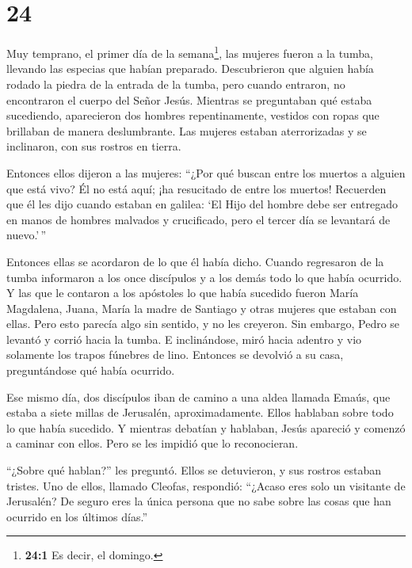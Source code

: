 \hypertarget{section-23}{%
\section{24}\label{section-23}}

 Muy temprano, el primer día de la semana\footnote{\textbf{24:1}
  Es decir, el domingo.}, las mujeres fueron a la tumba, llevando las
especias que habían preparado.  Descubrieron que alguien
había rodado la piedra de la entrada de la tumba,  pero
cuando entraron, no encontraron el cuerpo del Señor Jesús. 
Mientras se preguntaban qué estaba sucediendo, aparecieron dos hombres
repentinamente, vestidos con ropas que brillaban de manera deslumbrante.
 Las mujeres estaban aterrorizadas y se inclinaron, con sus
rostros en tierra.

Entonces ellos dijeron a las mujeres: ``¿Por qué buscan entre los
muertos a alguien que está vivo?  Él no está aquí; ¡ha
resucitado de entre los muertos! Recuerden que él les dijo cuando
estaban en galilea:  `El Hijo del hombre debe ser entregado
en manos de hombres malvados y crucificado, pero el tercer día se
levantará de nuevo.'\,''

 Entonces ellas se acordaron de lo que él había dicho.
 Cuando regresaron de la tumba informaron a los once
discípulos y a los demás todo lo que había ocurrido.  Y las
que le contaron a los apóstoles lo que había sucedido fueron María
Magdalena, Juana, María la madre de Santiago y otras mujeres que estaban
con ellas.  Pero esto parecía algo sin sentido, y no les
creyeron.  Sin embargo, Pedro se levantó y corrió hacia la
tumba. E inclinándose, miró hacia adentro y vio solamente los trapos
fúnebres de lino. Entonces se devolvió a su casa, preguntándose qué
había ocurrido.

 Ese mismo día, dos discípulos iban de camino a una aldea
llamada Emaús, que estaba a siete millas de Jerusalén, aproximadamente.
 Ellos hablaban sobre todo lo que había sucedido.
 Y mientras debatían y hablaban, Jesús apareció y comenzó a
caminar con ellos.  Pero se les impidió que lo
reconocieran.

 ``¿Sobre qué hablan?'' les preguntó. Ellos se detuvieron,
y sus rostros estaban tristes.  Uno de ellos, llamado
Cleofas, respondió: ``¿Acaso eres solo un visitante de Jerusalén? De
seguro eres la única persona que no sabe sobre las cosas que han
ocurrido en los últimos días.''

